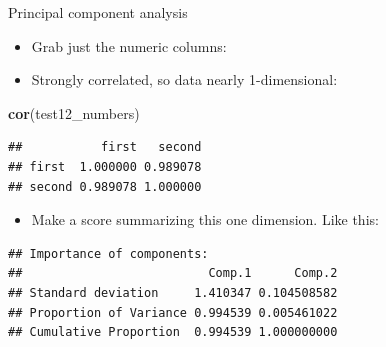 \documentclass[ignorenonframetext,]{beamer}
\newenvironment{Shaded}{\begin{snugshade}}{\end{snugshade}}
\newcommand{\DataTypeTok}[1]{\textcolor[rgb]{0.13,0.29,0.53}{#1}}
\newcommand{\KeywordTok}[1]{\textcolor[rgb]{0.13,0.29,0.53}{\textbf{#1}}}
\newcommand{\NormalTok}[1]{#1}
\newcommand{\OperatorTok}[1]{\textcolor[rgb]{0.81,0.36,0.00}{\textbf{#1}}}
\newcommand{\StringTok}[1]{\textcolor[rgb]{0.31,0.60,0.02}{#1}}
\providecommand{\tightlist}{%
  \setlength{\itemsep}{0pt}\setlength{\parskip}{0pt}}
\begin{document}
\begin{frame}[fragile]{Principal component analysis}
\protect\hypertarget{principal-component-analysis}{}

\begin{itemize}
\tightlist
\item
  Grab just the numeric columns:
\end{itemize}

\begin{Shaded}
\end{Shaded}

\begin{itemize}
\tightlist
\item
  Strongly correlated, so data nearly 1-dimensional:
\end{itemize}

\begin{Shaded}
\begin{Highlighting}[]
\KeywordTok{cor}\NormalTok{(test12_numbers)}
\end{Highlighting}
\end{Shaded}

\begin{verbatim}
##           first   second
## first  1.000000 0.989078
## second 0.989078 1.000000
\end{verbatim}

\begin{itemize}
\tightlist
\item
  Make a score summarizing this one dimension. Like this:
\end{itemize}

\begin{Shaded}
\end{Shaded}

\begin{verbatim}
## Importance of components:
##                          Comp.1      Comp.2
## Standard deviation     1.410347 0.104508582
## Proportion of Variance 0.994539 0.005461022
## Cumulative Proportion  0.994539 1.000000000
\end{verbatim}

\end{frame}
\end{document}

